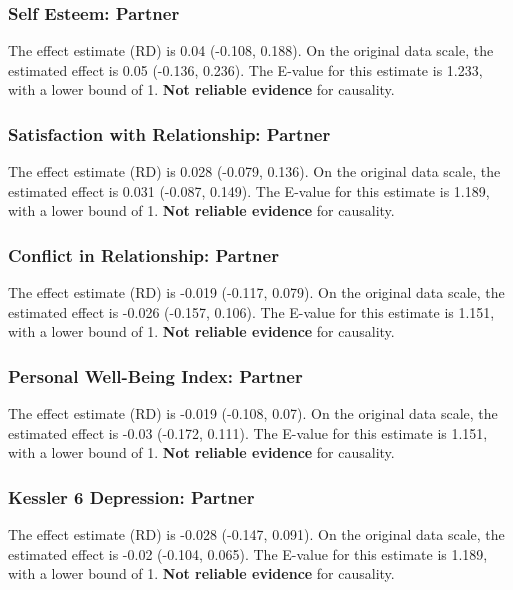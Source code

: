 \documentclass[
  singlecolumn]{article}
\begin{document}
\subsubsection{Self Esteem: Partner}\label{self-esteem-partner-10}

The effect estimate (RD) is 0.04 (-0.108, 0.188). On the original data
scale, the estimated effect is 0.05 (-0.136, 0.236). The E-value for
this estimate is 1.233, with a lower bound of 1. \textbf{Not reliable
evidence} for causality.

\subsubsection{Satisfaction with Relationship:
Partner}\label{satisfaction-with-relationship-partner-10}

The effect estimate (RD) is 0.028 (-0.079, 0.136). On the original data
scale, the estimated effect is 0.031 (-0.087, 0.149). The E-value for
this estimate is 1.189, with a lower bound of 1. \textbf{Not reliable
evidence} for causality.

\subsubsection{Conflict in Relationship:
Partner}\label{conflict-in-relationship-partner-10}

The effect estimate (RD) is -0.019 (-0.117, 0.079). On the original data
scale, the estimated effect is -0.026 (-0.157, 0.106). The E-value for
this estimate is 1.151, with a lower bound of 1. \textbf{Not reliable
evidence} for causality.

\subsubsection{Personal Well-Being Index:
Partner}\label{personal-well-being-index-partner-10}

The effect estimate (RD) is -0.019 (-0.108, 0.07). On the original data
scale, the estimated effect is -0.03 (-0.172, 0.111). The E-value for
this estimate is 1.151, with a lower bound of 1. \textbf{Not reliable
evidence} for causality.

\subsubsection{Kessler 6 Depression:
Partner}\label{kessler-6-depression-partner-10}

The effect estimate (RD) is -0.028 (-0.147, 0.091). On the original data
scale, the estimated effect is -0.02 (-0.104, 0.065). The E-value for
this estimate is 1.189, with a lower bound of 1. \textbf{Not reliable
evidence} for causality.
\end{document}
